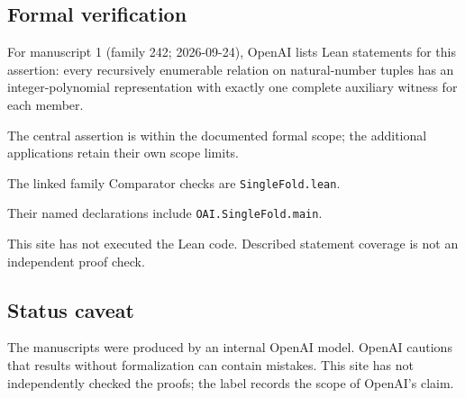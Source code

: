 \documentclass[11pt]{article}
\begin{document}
\subsection{Formal verification}
For manuscript 1 (family 242; 2026-09-24), OpenAI lists Lean statements for this assertion: every recursively enumerable relation on natural-number tuples has an integer-polynomial representation with exactly one complete auxiliary witness for each member.

The central assertion is within the documented formal scope; the additional applications retain their own scope limits.

The linked family Comparator checks are \texttt{SingleFold.lean}.

Their named declarations include \texttt{OAI.SingleFold.main}.

This site has not executed the Lean code. Described statement coverage is not an independent proof check.

\subsection{Status caveat}
The manuscripts were produced by an internal OpenAI model. OpenAI cautions that results without formalization can contain mistakes. This site has not independently checked the proofs; the label records the scope of OpenAI's claim.
\end{document}
